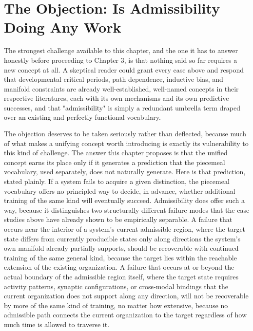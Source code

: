 \documentclass[11pt]{book}
\begin{document}
\section{The Objection: Is Admissibility Doing Any Work}

The strongest challenge available to this chapter, and the one it has to answer honestly before proceeding to Chapter 3, is that nothing said so far requires a new concept at all. A skeptical reader could grant every case above and respond that developmental critical periods, path dependence, inductive bias, and manifold constraints are already well-established, well-named concepts in their respective literatures, each with its own mechanisms and its own predictive successes, and that "admissibility" is simply a redundant umbrella term draped over an existing and perfectly functional vocabulary.

The objection deserves to be taken seriously rather than deflected, because much of what makes a unifying concept worth introducing is exactly its vulnerability to this kind of challenge. The answer this chapter proposes is that the unified concept earns its place only if it generates a prediction that the piecemeal vocabulary, used separately, does not naturally generate. Here is that prediction, stated plainly. If a system fails to acquire a given distinction, the piecemeal vocabulary offers no principled way to decide, in advance, whether additional training of the same kind will eventually succeed. Admissibility does offer such a way, because it distinguishes two structurally different failure modes that the case studies above have already shown to be empirically separable. A failure that occurs near the interior of a system's current admissible region, where the target state differs from currently producible states only along directions the system's own manifold already partially supports, should be recoverable with continued training of the same general kind, because the target lies within the reachable extension of the existing organization. A failure that occurs at or beyond the actual boundary of the admissible region itself, where the target state requires activity patterns, synaptic configurations, or cross-modal bindings that the current organization does not support along any direction, will not be recoverable by more of the same kind of training, no matter how extensive, because no admissible path connects the current organization to the target regardless of how much time is allowed to traverse it.
\end{document}
